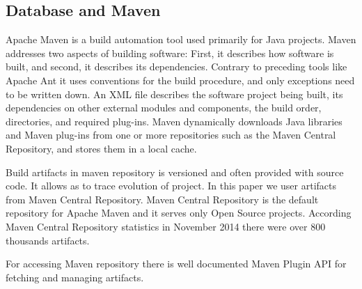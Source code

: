 \subsection{Database and Maven}

Apache Maven is a build automation tool used primarily for Java projects. Maven
addresses two aspects of building software: First, it describes how software is built, 
and second, it describes its dependencies. Contrary to preceding tools like Apache
Ant it uses conventions for the build procedure, and only exceptions need to be
written down. An XML file describes the software project being built, its
dependencies on other external modules and components, the build order, 
directories, and required plug-ins. Maven dynamically downloads Java libraries
and Maven plug-ins from one or more repositories such as the Maven  Central 
Repository, and stores them in a local cache.

Build artifacts in maven repository is versioned and often provided with source
code. It allows as to trace evolution of project. In this paper we user
artifacts from Maven Central Repository. Maven Central Repository is
the default repository for Apache Maven and it serves only Open Source projects. 
According Maven Central Repository statistics in November 2014 there were over 800 
thousands artifacts.

For accessing Maven repository there is well documented Maven Plugin API for
fetching and managing artifacts.

